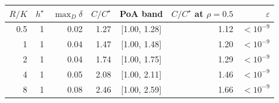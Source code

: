\begin{tabular}{rrrrcrr}
\toprule
$R/K$ & $h^\star$ & $\max_D \delta$ & $C/C^\star$ & PoA band & $C/C^\star$ at $\rho{=}0.5$ & $\varepsilon$ \\
\midrule
0.5 & 1 & 0.02 & 1.27 & [1.00, 1.28] & 1.12 & $<10^{-9}$ \\
1 & 1 & 0.04 & 1.47 & [1.00, 1.48] & 1.20 & $<10^{-9}$ \\
2 & 1 & 0.04 & 1.74 & [1.00, 1.75] & 1.29 & $<10^{-9}$ \\
4 & 1 & 0.05 & 2.08 & [1.00, 2.11] & 1.46 & $<10^{-9}$ \\
8 & 1 & 0.08 & 2.46 & [1.00, 2.59] & 1.66 & $<10^{-9}$ \\
\bottomrule
\end{tabular}
